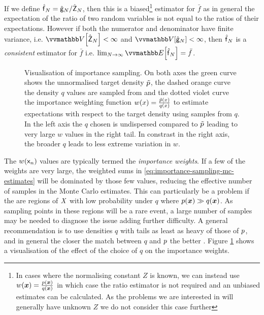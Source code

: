 If we define $\hatf_N = \hat{\rvar{g}}_N / \hat{\rvar{Z}}_N$, then this is a biased\footnote{In cases where the normalising constant $Z$ is known, we can instead use $w(\boldsymbol{x}) = \frac{p(\boldsymbol{x})}{q(\boldsymbol{x})}$ in which case the ratio estimator is not required and an unbiased estimates can be calculated. As the problems we are interested in will generally have unknown $Z$ we do not consider this case further} estimator for $\bar{f}$ as in general the expectation of the ratio of two random variables is not equal to the ratios of their expectations. However if both the numerator and denominator have finite variance, i.e. $\var{\hat{\rvar{Z}}_N} < \infty$ and $\var{\hat{\rvar{g}}_N} < \infty$, then $\hatf_N$ is a \emph{consistent} estimator for $\bar{f}$ i.e. $\lim_{N\to\infty} \expc{\hatf_N} = \bar{f}$.

\begin{figure}[t]
\centering
\pgfplotsset{cycle list/Dark2-3}
\begin{subfigure}[b]{.48\linewidth}
\centering
{}
\end{subfigure}
\begin{subfigure}[b]{.48\linewidth}
\centering
{}
\end{subfigure}
\caption[Visualisation of importance sampling.]{Visualisation of importance sampling. On both axes the green curve shows the unnormalised target density $\tilde{p}$, the dashed orange curve the density $q$ values are sampled from and the dotted violet curve the importance weighting function $w(x) = \frac{\tilde{p}(x)}{q(x)}$ to estimate expectations with respect to the target density using samples from $q$. In the left axis the $q$ chosen is undispersed compared to $\tilde{p}$ leading to very large $w$ values in the right tail. In constrast in the right axis, the broader $q$ leads to less extreme variation in $w$.}
\label{fig:importance-sampling}
\end{figure}

The $w(\mathsf{x}_n)$ values are typically termed the \emph{importance weights}. If a few of the weights are very large, the weighted sums in \eqref{eq:importance-sampling-mc-estimates} will be dominated by those few values, reducing the effective number of samples in the Monte Carlo estimates. This can particularly be a problem if the are regions of $\mathit{X}$ with low probability under $q$ where $p(\boldsymbol{x}) \gg q(\boldsymbol{x})$. As sampling points in these regions will be a rare event, a large number of samples may be needed to diagnose the issue adding further difficulty. A general recommendation is to use densities $q$ with tails as least as heavy of those of $p$, and in general the closer the match between $q$ and $p$ the better \citep{mackay2003information,owen2013importance}. Figure \ref{fig:importance-sampling} shows a visualisation of the effect of the choice of $q$ on the importance weights.

